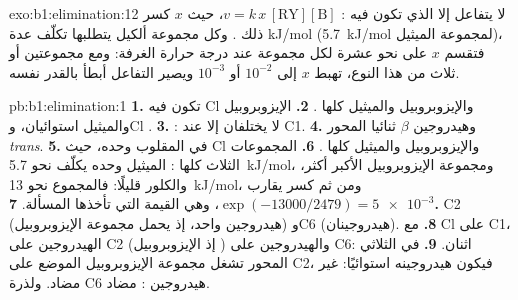 \begin{solution}{exo:b1:elimination:12}
لا يتفاعل إلا  الذي تكون فيه  : $v = k\,x\,[\mathrm{RY}][\mathrm{B}]$،
حيث $x$ كسر ذلك . وكل مجموعة ألكيل  يتطلبها
تكلّف عدة kJ/mol (\qty{5.7}{kJ/mol} لمجموعة الميثيل)، فتقسم $x$ على نحو
عشرة لكل مجموعة عند درجة حرارة الغرفة: ومع مجموعتين أو ثلاث من هذا النوع، تهبط $x$
إلى $10^{-2}$ أو $10^{-3}$ ويصير التفاعل أبطأ بالقدر نفسه.
\end{solution}

\begin{solution}{pb:b1:elimination:1}
\textbf{1.}  تكون فيه Cl والإيزوبروبيل والميثيل كلها .
\textbf{2.} الإيزوبروبيل والميثيل استوائيان، وCl .
\textbf{3.} : لا يختلفان إلا عند C1.
\textbf{4.}  وهيدروجين $\beta$ ثنائيا المحور \textit{trans}.
\textbf{5.} في  المقلوب وحده، حيث Cl والإيزوبروبيل والميثيل كلها
.
\textbf{6.} المجموعات الثلاث كلها : الميثيل وحده يكلّف نحو
\qty{5.7}{kJ/mol}، ومجموعة الإيزوبروبيل الأكبر أكثر، والكلور قليلًا:
فالمجموع نحو \qty{13}{kJ/mol}، ومن ثم كسر يقارب
$\exp(-13000/2479) = \num{5e-3}$، وهي القيمة التي تأخذها المسألة.
\textbf{7.} C2 (هيدروجين واحد، إذ يحمل مجموعة الإيزوبروبيل) وC6 (هيدروجينان).
\textbf{8.} مع Cl  على C1، الهيدروجين  على C2 (إذ الإيزوبروبيل
) والهيدروجين  على C6: اثنان.
\textbf{9.} في  الثلاثي المحور تشغل مجموعة الإيزوبروبيل الموضع 
على C2، فيكون هيدروجينه استوائيًا: غير مضاد. ولذرة C6 هيدروجين : مضاد.

\end{solution}
